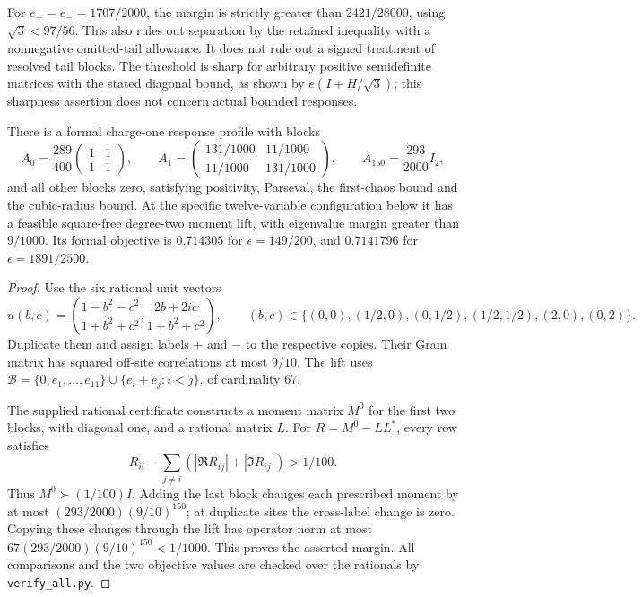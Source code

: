 For $e_+=e_-=1707/2000$, the margin is strictly greater than
$2421/28000$, using $\sqrt3<97/56$. This also rules out separation by
the retained inequality with a nonnegative omitted-tail allowance.
It does not rule out a signed treatment of resolved tail blocks.
The threshold is sharp for arbitrary positive semidefinite matrices
with the stated diagonal bound, as shown by $e(I+H/\sqrt3)$; this
sharpness assertion does not concern actual bounded responses.

\begin{proposition}
There is a formal charge-one response profile with blocks
\[
 A_0=\frac{289}{400}\begin{pmatrix}1&1\\1&1\end{pmatrix},\qquad
 A_1=\begin{pmatrix}131/1000&11/1000\\11/1000&131/1000\end{pmatrix},\qquad
 A_{150}=\frac{293}{2000}I_2,
\]
and all other blocks zero, satisfying positivity, Parseval, the
first-chaos bound and the cubic-radius bound. At the specific
twelve-variable configuration below it has a feasible square-free
degree-two moment lift, with eigenvalue margin greater than $9/1000$.
Its formal objective is $0.714305$ for $\epsilon=149/200$, and
$0.7141796$ for $\epsilon=1891/2500$.
\end{proposition}
\begin{proof}
Use the six rational unit vectors
\[
 u(b,c)=\left(\frac{1-b^2-c^2}{1+b^2+c^2},
              \frac{2b+2ic}{1+b^2+c^2}\right),\qquad
 (b,c)\in\{(0,0),(1/2,0),(0,1/2),(1/2,1/2),(2,0),(0,2)\}.
\]
Duplicate them and assign labels $+$ and $-$ to the respective copies.
Their Gram matrix has squared off-site correlations at most $9/10$.
The lift uses
$\mathcal B=\{0,e_1,\ldots,e_{11}\}\cup\{e_i+e_j:i<j\}$,
of cardinality $67$.

The supplied rational certificate constructs a moment matrix $M^0$
for the first two blocks, with diagonal one, and a rational matrix $L$.
For $R=M^0-LL^*$, every row satisfies
\[
 R_{ii}-\sum_{j\ne i}(|\Re R_{ij}|+|\Im R_{ij}|)>1/100.
\]
Thus $M^0\succ(1/100)I$. Adding the last block changes each prescribed
moment by at most $(293/2000)(9/10)^{150}$; at duplicate sites the
cross-label change is zero. Copying these changes through the lift
has operator norm at most $67(293/2000)(9/10)^{150}<1/1000$.
This proves the asserted margin. All comparisons and the two objective
values are checked over the rationals by \texttt{verify\_all.py}.
\end{proof}

